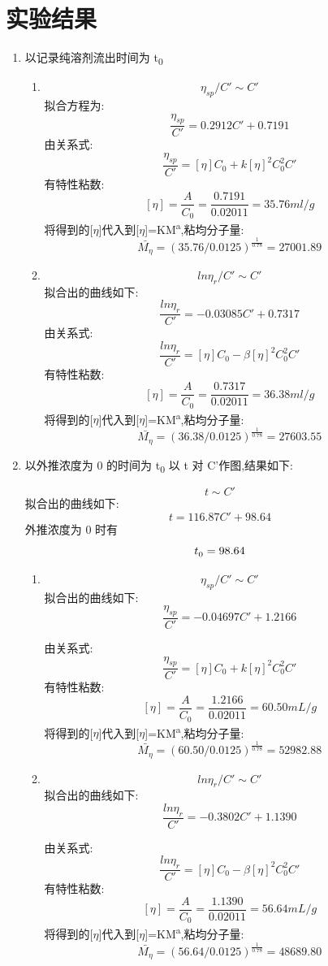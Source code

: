 \documentclass[11pt]{report}
\begin{document}
\section{实验结果}
\label{sec:org07a312d}
\begin{enumerate}
\item 以记录纯溶剂流出时间为 t\textsubscript{0}
\label{sec:orga4cc60e}
\begin{enumerate}
\item 
\label{sec:orga03e1ad}

\[
\eta_{sp}/C' \sim C'
\]
拟合方程为:
\[
\frac{\eta_{sp}}{C'}=0.2912C'+0.7191
\]
由关系式:
\[
\frac{\eta_{sp}}{C'}=[\eta]C_{0}+k[\eta]^{2}C_{0}^{2}C'
\]
有特性粘数:
\[
[\eta]=\frac{A}{C_{0}}=\frac{0.7191}{0.02011}=35.76ml/g
\]
将得到的[\(\eta\)]代入到[\(\eta\)]=KM\textsuperscript{a},粘均分子量:
\[
\bar{M_{\eta}}=(35.76/0.0125)^{\frac{1}{0.78}}=27001.89
\]

\item 
\label{sec:orga52c511}
\[
ln\eta_{r}/C' \sim C'
\]
拟合出的曲线如下:
\[
\frac{ln\eta_{r}}{C'}=-0.03085C'+0.7317
\]
由关系式:
\[
\frac{ln\eta_{r}}{C'}=[\eta]C_{0}-\beta[\eta]^{2}C_{0}^{2}C'
\]
有特性粘数:
\[
[\eta]=\frac{A}{C_{0}}=\frac{0.7317}{0.02011}=36.38ml/g
\]
将得到的[\(\eta\)]代入到[\(\eta\)]=KM\textsuperscript{a},粘均分子量:
\[
\bar{M_{\eta}}=(36.38/0.0125)^{\frac{1}{0.78}}=27603.55
\]
\end{enumerate}

\item 以外推浓度为 0 的时间为 t\textsubscript{0}
\label{sec:org36f8052}
以 t 对 C'作图,结果如下:

\[
t\sim C'
\]
拟合出的曲线如下:
\[
t=116.87C'+98.64
\]
外推浓度为 0 时有
\[
t_{0}^{\*}=98.64
\]
\begin{enumerate}
\item 
\label{sec:org600e462}
\[
\eta_{sp}/C'\sim C'
\]
拟合出的曲线如下:
\[
\frac{\eta_{sp}}{C'}=-0.04697C'+1.2166
\]

由关系式:
\[
\frac{\eta_{sp}}{C'}=[\eta]C_{0}+k[\eta]^{2}C_{0}^{2}C'
\]
有特性粘数:
\[
[\eta]=\frac{A}{C_{0}}=\frac{1.2166}{0.02011}=60.50mL/g
\]
将得到的[\(\eta\)]代入到[\(\eta\)]=KM\textsuperscript{a},粘均分子量:
\[
\bar{M_{\eta}}=(60.50/0.0125)^{\frac{1}{0.78}}=52982.88
\]

\item 
\label{sec:orgdbeddd0}
\[
ln\eta_{r}/C' \sim C'
\]
拟合出的曲线如下:
\[
\frac{ln\eta_{r}}{C'}=-0.3802C'+1.1390
\]

由关系式:
\[
\frac{ln\eta_{r}}{C'}=[\eta]C_{0}-\beta[\eta]^{2}C_{0}^{2}C'
\]
有特性粘数:
\[
[\eta]=\frac{A}{C_{0}}=\frac{1.1390}{0.02011}=56.64mL/g
\]
将得到的[\(\eta\)]代入到[\(\eta\)]=KM\textsuperscript{a},粘均分子量:
\[
\bar{M_{\eta}}=(56.64/0.0125)^{\frac{1}{0.78}}=48689.80
\]
\end{enumerate}
\end{enumerate}
\end{document}
